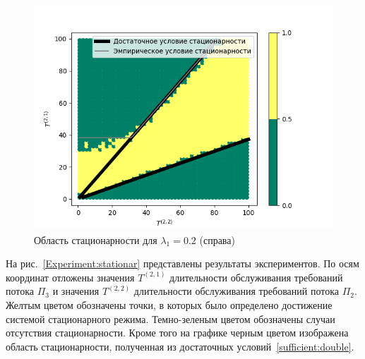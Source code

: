 \documentclass[11pt]{ubs}
\begin{document}
\begin{figure}[ht]
    \includegraphics[scale=0.7]{0_2_thres_10_fact.png} 
\caption{Область стационарности для $\lambda_1 = 0.2$ (справа)}
\label{Experiment:intensities:two}
\end{figure}


На рис.~\ref{Experiment:stationar} представлены результаты экспериментов. По осям координат отложены значения $T^{(2,1)}$ длительности обслуживания требований потока $\Pi_3$ и значения $T^{(2,2)}$ длительности обслуживания требований потока $\Pi_2$. Желтым цветом обозначены точки, в которых было определено достижение системой стационарного режима. Темно-зеленым цветом обозначены случаи отсутствия стационарности. Кроме того на графике черным цветом изображена область стационарности, полученная из достаточных условий~\ref{sufficient:double}. 
\end{document}
